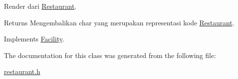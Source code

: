 Render dari \hyperlink{classRestaurant}{Restaurant}. 

\begin{DoxyReturn}{Returns}
Mengembalikan char yang merupakan representasi kode \hyperlink{classRestaurant}{Restaurant}. 
\end{DoxyReturn}


Implements \hyperlink{classFacility_a177b3f9cd142fe4521c1d15b00d3675c}{Facility}.



The documentation for this class was generated from the following file\+:\begin{DoxyCompactItemize}
\item 
\hyperlink{restaurant_8h}{restaurant.\+h}\end{DoxyCompactItemize}
